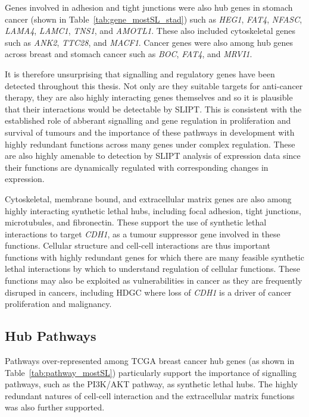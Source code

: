 Genes involved in adhesion and tight junctions were also hub genes in stomach cancer (shown in Table~\ref{tab:gene_mostSL_stad}) such as \textit{HEG1}, \textit{FAT4}, \textit{NFASC}, \textit{LAMA4}, \textit{LAMC1}, \textit{TNS1}, and \textit{AMOTL1}. These also included cytoskeletal genes such as \textit{ANK2}, \textit{TTC28}, and \textit{MACF1}. Cancer genes were also among hub genes across breast and stomach cancer such as \textit{BOC}, \textit{FAT4}, and \textit{MRVI1}. 

It is therefore unsurprising that signalling and regulatory genes have been detected throughout this thesis. Not only are they suitable targets for anti-cancer therapy, they are also highly interacting genes themselves and so it is plausible that their interactions would be detectable by \gls{SLIPT}. This is consistent with the established role of abberant signalling and gene regulation in proliferation and survival of tumours and the importance of these pathways in development with highly redundant functions across many genes under complex regulation. These are also highly amenable to detection by \gls{SLIPT} analysis of expression data since their functions are dynamically regulated with corresponding changes in expression.

Cytoskeletal, membrane bound, and extracellular matrix genes are also among highly interacting synthetic lethal hubs, including focal adhesion, tight junctions, microtubules, and fibronectin. These support the use of synthetic lethal interactions to target \textit{CDH1}, as a tumour suppressor gene involved in these functions. Cellular structure and cell-cell interactions are thus important functions with highly redundant genes for which there are many feasible synthetic lethal interactions by which to understand regulation of cellular functions. These functions may also be exploited as vulnerabilities in cancer as they are frequently disruped in cancers, including HDGC where loss of \textit{CDH1} is a driver of cancer proliferation and malignancy.  


\FloatBarrier

\subsection{Hub Pathways}

Pathways over-represented among TCGA breast cancer hub genes (as shown in Table~\ref{tab:pathway_mostSL}) particularly support the importance of signalling pathways, such as the PI3K/AKT pathway, as synthetic lethal hubs. The highly redundant natures of cell-cell interaction and the extracellular matrix functions was also further supported.


